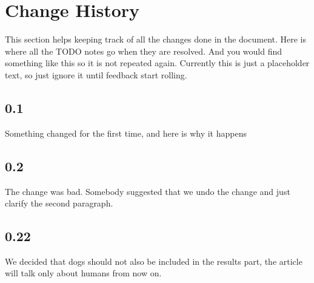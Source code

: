 \documentclass[10pt, a4paper, onecolumn]{article} %
\begin{document}















\newpage

\section{Change History}

This section helps keeping track of all the changes done in the document. Here is where all the TODO notes go when they are resolved. And you would find something like this so it is not repeated again. Currently this is just a placeholder text, so just ignore it until feedback start rolling.\\

\subsection*{0.1}

Something changed for the first time, and here is why it happens

\subsection*{0.2}

The change was bad. Somebody suggested that we undo the change and just clarify the second paragraph.

\subsection*{0.22}

We decided that dogs should not also be included in the results part, the article will talk only about humans from now on.
\end{document}
